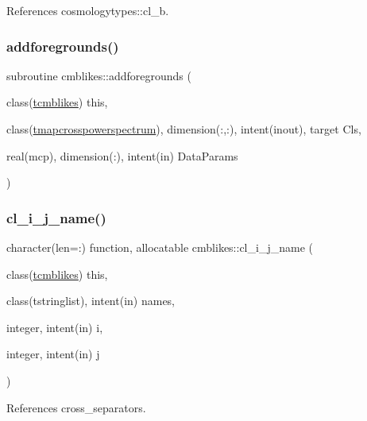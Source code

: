 References cosmologytypes\+::cl\+\_\+b.

\mbox{\label{namespacecmblikes_a6653a1b9a17f3c0c4d5025a40de7d134}} 
\subsubsection{\texorpdfstring{addforegrounds()}{addforegrounds()}}
{\footnotesize\ttfamily subroutine cmblikes\+::addforegrounds (\begin{DoxyParamCaption}\item[{class(\mbox{\hyperlink{structcmblikes_1_1tcmblikes}{tcmblikes}})}]{this,  }\item[{class(\mbox{\hyperlink{structcmblikes_1_1tmapcrosspowerspectrum}{tmapcrosspowerspectrum}}), dimension(\+:,\+:), intent(inout), target}]{Cls,  }\item[{real(mcp), dimension(\+:), intent(in)}]{Data\+Params }\end{DoxyParamCaption})\hspace{0.3cm}{\ttfamily [private]}}

\mbox{\label{namespacecmblikes_a44a1c6a75608d89a037ffc9ea4571aa3}} 
\subsubsection{\texorpdfstring{cl\+\_\+i\+\_\+j\+\_\+name()}{cl\_i\_j\_name()}}
{\footnotesize\ttfamily character(len=\+:) function, allocatable cmblikes\+::cl\+\_\+i\+\_\+j\+\_\+name (\begin{DoxyParamCaption}\item[{class(\mbox{\hyperlink{structcmblikes_1_1tcmblikes}{tcmblikes}})}]{this,  }\item[{class(tstringlist), intent(in)}]{names,  }\item[{integer, intent(in)}]{i,  }\item[{integer, intent(in)}]{j }\end{DoxyParamCaption})\hspace{0.3cm}{\ttfamily [private]}}



References cross\+\_\+separators.

